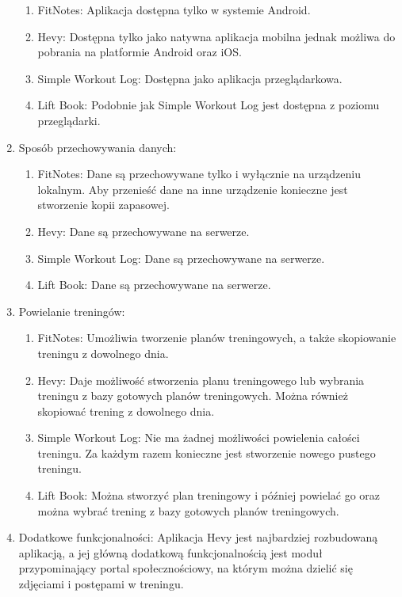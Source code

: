 \documentclass{article}
\begin{document}
\begin{enumerate}
                              \begin{enumerate}
                                    \item FitNotes: Aplikacja dostępna tylko w systemie Android.
                                    \item Hevy: Dostępna tylko jako natywna aplikacja mobilna jednak możliwa do pobrania na platformie Android oraz iOS.
                                    \item Simple Workout Log: Dostępna jako aplikacja przeglądarkowa.
                                    \item Lift Book: Podobnie jak Simple Workout Log jest dostępna z poziomu przeglądarki.
                              \end{enumerate}
                        \item Sposób przechowywania danych: 
                              \begin{enumerate}
                                    \item FitNotes: Dane są przechowywane tylko i wyłącznie na urządzeniu lokalnym. Aby przenieść dane na inne urządzenie konieczne jest stworzenie kopii zapasowej.
                                    \item Hevy: Dane są przechowywane na serwerze.
                                    \item Simple Workout Log: Dane są przechowywane na serwerze.
                                    \item Lift Book: Dane są przechowywane na serwerze.
                              \end{enumerate}
                        \item Powielanie treningów: 
                              \begin{enumerate}
                                    \item FitNotes: Umożliwia tworzenie planów treningowych, a także skopiowanie treningu z dowolnego dnia.
                                    \item Hevy: Daje możliwość stworzenia planu treningowego lub wybrania treningu z bazy gotowych planów treningowych. Można również skopiować trening z dowolnego dnia.
                                    \item Simple Workout Log: Nie ma żadnej możliwości powielenia całości treningu. Za każdym razem konieczne jest stworzenie nowego pustego treningu.
                                    \item Lift Book: Można stworzyć plan treningowy i później powielać go oraz można wybrać trening z bazy gotowych planów treningowych.
                              \end{enumerate}
                        \item Dodatkowe funkcjonalności: 
                              Aplikacja Hevy jest najbardziej rozbudowaną aplikacją, a jej główną dodatkową funkcjonalnością jest moduł przypominający portal społecznościowy, na którym można dzielić się zdjęciami i postępami w treningu.
                  \end{enumerate}
\end{document}
